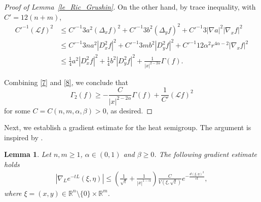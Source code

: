 \documentclass[12pt]{amsart}
\theoremstyle{plain}
\newtheorem{lemma}[theorem]{Lemma}
\theoremstyle{definition}
\numberwithin{equation}{section}
\begin{document}
\begin{proof}[Proof of Lemma~\ref{le_Ric_Grushin}]
On the other hand, by trace inequality, with $C'=12(n+m)$, 
\begin{align}\label{8}
C'^{-1}(\mathcal L f)^2 &\le
C'^{-1} 3a^2(\Delta_x f)^2+ C'^{-1} 3b^2(\Delta_y f)^2+ C'^{-1}3|\nabla a|^2|\nabla_x f|^2\\ \nonumber
&\le C'^{-1} 3n a^2|D_x^2 f|^2 + C'^{-1} 3m b^2|D_y^2 f|^2 + C'^{-1} 12\alpha^2 r^{4\alpha-2}|\nabla_x f|^2\\ \nonumber
&\le \frac14 a^2|D_x^2 f|^2+\frac14 b^2|D_y^2 f|^2+\frac1{|x|^{2-2\alpha}}\Gamma(f).
\end{align}

Combining \eqref{7} and \eqref{8}, we conclude that
\begin{equation*}
    \Gamma_2(f)\ge -\frac{C}{|x|^{2-2\alpha}}\Gamma(f)+\frac1{C'}(\mathcal L f)^2
\end{equation*}
for some $C=C(n,m,\alpha,\beta)>0$, as desired.





\end{proof}




Next, we establish a gradient estimate for the heat semigroup. The argument is inspired by \cite[Sections~3.2--3.3]{Gilles}.




\begin{lemma}\label{le_Grushin_gradient}
Let $n, m\ge 1$, $\alpha \in (0,1)$ and $\beta \ge 0$. The following gradient estimate holds
\begin{align*}
    \left|\nabla_{L}e^{-tL}(\xi,\eta)\right|\le \left(\frac{1}{\sqrt{t}} + \frac{1}{|x|^{1-\alpha}}\right) \frac{C}{V(\xi,\sqrt{t})}e^{-\frac{d(\xi,\eta)^2}{ct}},
\end{align*}
where $\xi = (x,y) \in \mathbb{R}^n \setminus \{0\} \times \mathbb{R}^m$.
\end{lemma}

\end{document}
